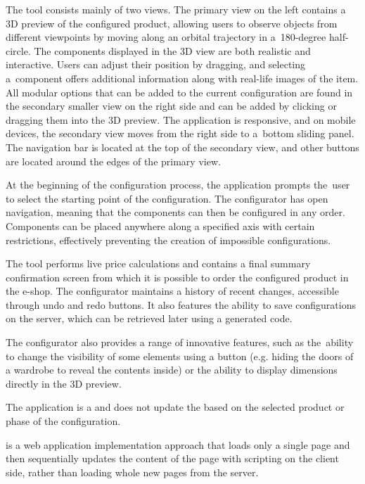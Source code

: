 The tool consists mainly of two views. The primary view on the left contains a 3D preview of the configured product, allowing users to observe objects from different viewpoints by moving along an orbital trajectory in a~180-degree half-circle. The components displayed in the 3D view are both realistic and interactive. Users can adjust their position by dragging, and selecting a~component offers additional information along with real-life images of the item. All modular options that can be added to the current configuration are found in the secondary smaller view on the right side and can be added by clicking or dragging them into the 3D preview. The application is responsive, and on mobile devices, the secondary view moves from the right side to a~bottom sliding panel. The navigation bar is located at the top of the secondary view, and other buttons are located around the edges of the primary view.

At the beginning of the configuration process, the application prompts the~user to select the starting point of the configuration. The configurator has open navigation, meaning that the components can then be configured in any order. Components can be placed anywhere along a specified axis with certain restrictions, effectively preventing the creation of impossible configurations.

The tool performs live price calculations and contains a final summary confirmation screen from which it is possible to order the configured product in the e-shop. The configurator maintains a history of recent changes, accessible through undo and redo buttons. It also features the ability to save configurations on the server, which can be retrieved later using a generated code.

The configurator also provides a range of innovative features, such as the~ability to change the visibility of some elements using a button (e.g. hiding the doors of a wardrobe to reveal the contents inside) or the ability to display dimensions directly in the 3D preview.

The application is a  and does not update the  based on the selected product or phase of the configuration.

 is a web application implementation approach that loads only a single page and then sequentially updates the content of the page with scripting on the client side, rather than loading whole new pages from the server.~\cite{Fink2014}



